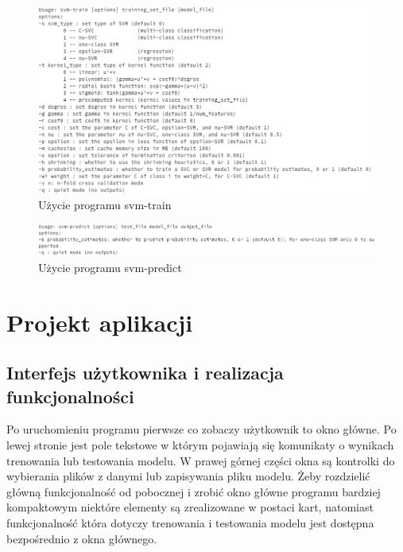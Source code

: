 \documentclass[paper=a4, fontsize=11pt]{scrartcl} %
\numberwithin{equation}{section} %
\numberwithin{figure}{section} %
\begin{document}
    \begin{figure}[h]
        \begin{center}
            \includegraphics[scale=0.6]{./img/svm_train_usage.png}
            \caption{Użycie programu svm-train}
            \label{fig:train_usage}
        \end{center}
    \end{figure}

    \begin{figure}[h]
        \begin{center}
            \includegraphics[scale=0.6]{./img/svm_predict_usage.png}
            \caption{Użycie programu svm-predict}
            \label{fig:predict_usage}
        \end{center}
    \end{figure}


\newpage
\section{Projekt aplikacji} %
\subsection{Interfejs użytkownika i realizacja funkcjonalności}
    \par Po uruchomieniu programu pierwsze co zobaczy użytkownik to okno główne. Po lewej
    stronie jest pole tekstowe w którym pojawiają się komunikaty o wynikach trenowania lub
    testowania modelu. W prawej górnej części okna są kontrolki do wybierania plików z danymi
    lub zapisywania pliku modelu. Żeby rozdzielić główną funkcjonalność od pobocznej i zrobić
    okno główne programu bardziej kompaktowym niektóre elementy są zrealizowane w postaci kart,
    natomiast funkcjonalność która dotyczy trenowania i testowania modelu jest
    dostępna bezpośrednio z okna głównego.
\end{document}
